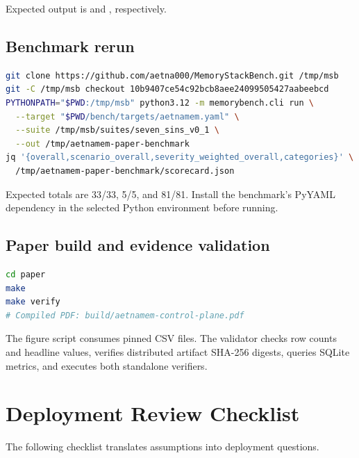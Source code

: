 Expected output is  and , respectively.

\subsection{Benchmark rerun}

\begin{lstlisting}[language=bash]
git clone https://github.com/aetna000/MemoryStackBench.git /tmp/msb
git -C /tmp/msb checkout 10b9407ce54c92bcb8aee24099505427aabeebcd
PYTHONPATH="$PWD:/tmp/msb" python3.12 -m memorybench.cli run \
  --target "$PWD/bench/targets/aetnamem.yaml" \
  --suite /tmp/msb/suites/seven_sins_v0_1 \
  --out /tmp/aetnamem-paper-benchmark
jq '{overall,scenario_overall,severity_weighted_overall,categories}' \
  /tmp/aetnamem-paper-benchmark/scorecard.json
\end{lstlisting}

Expected totals are 33/33, 5/5, and 81/81. Install the benchmark's PyYAML dependency in the selected Python environment before running.

\subsection{Paper build and evidence validation}

\begin{lstlisting}[language=bash]
cd paper
make
make verify
# Compiled PDF: build/aetnamem-control-plane.pdf
\end{lstlisting}

The figure script consumes pinned CSV files. The validator checks row counts and headline values, verifies distributed artifact SHA-256 digests, queries SQLite metrics, and executes both standalone verifiers.

\section{Deployment Review Checklist}

The following checklist translates assumptions into deployment questions.


